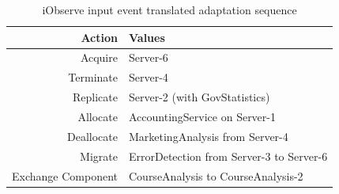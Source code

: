 \begin{table}[h]
	\centering
	\begin{tabular}{r | l}
		\hline
		\textbf{Action} & \textbf{Values}\\
		\hline
		Acquire & Server-6\\
		Terminate & Server-4\\
		Replicate & Server-2 (with GovStatistics)\\
		
		Allocate & AccountingService on Server-1\\
		Deallocate & MarketingAnalysis from Server-4\\
		Migrate & ErrorDetection from Server-3 to Server-6\\
		Exchange Component & CourseAnalysis to CourseAnalysis-2\\
		\hline
	\end{tabular}
	\caption{iObserve input event translated adaptation sequence}
	\label{tab:eval:adapt:action_input_result}
\end{table}





